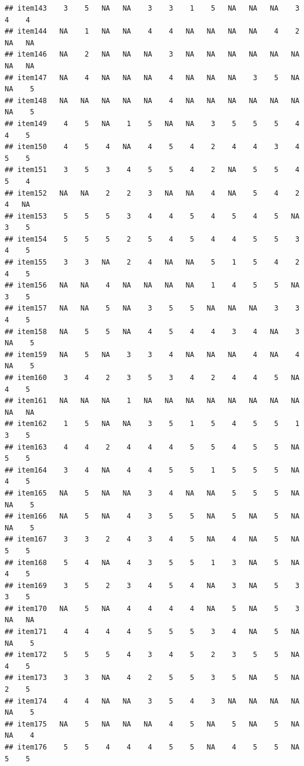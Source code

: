 \documentclass[
  man]{apa6}
\begin{document}
\begin{verbatim}
## item143    3    5   NA   NA    3    3    1    5   NA   NA   NA    3    4    4
## item144   NA    1   NA   NA    4    4   NA   NA   NA   NA    4    2   NA   NA
## item146   NA    2   NA   NA   NA    3   NA   NA   NA   NA   NA   NA   NA   NA
## item147   NA    4   NA   NA   NA    4   NA   NA   NA    3    5   NA   NA    5
## item148   NA   NA   NA   NA   NA    4   NA   NA   NA   NA   NA   NA   NA    5
## item149    4    5   NA    1    5   NA   NA    3    5    5    5    4    4    5
## item150    4    5    4   NA    4    5    4    2    4    4    3    4    5    5
## item151    3    5    3    4    5    5    4    2   NA    5    5    4    5    4
## item152   NA   NA    2    2    3   NA   NA    4   NA    5    4    2    4   NA
## item153    5    5    5    3    4    4    5    4    5    4    5   NA    3    5
## item154    5    5    5    2    5    4    5    4    4    5    5    3    4    5
## item155    3    3   NA    2    4   NA   NA    5    1    5    4    2    4    5
## item156   NA   NA    4   NA   NA   NA   NA    1    4    5    5   NA    3    5
## item157   NA   NA    5   NA    3    5    5   NA   NA   NA    3    3    4    5
## item158   NA    5    5   NA    4    5    4    4    3    4   NA    3   NA    5
## item159   NA    5   NA    3    3    4   NA   NA   NA    4   NA    4   NA    5
## item160    3    4    2    3    5    3    4    2    4    4    5   NA    4    5
## item161   NA   NA   NA    1   NA   NA   NA   NA   NA   NA   NA   NA   NA   NA
## item162    1    5   NA   NA    3    5    1    5    4    5    5    1    3    5
## item163    4    4    2    4    4    4    5    5    4    5    5   NA    5    5
## item164    3    4   NA    4    4    5    5    1    5    5    5   NA    4    5
## item165   NA    5   NA   NA    3    4   NA   NA    5    5    5   NA   NA    5
## item166   NA    5   NA    4    3    5    5   NA    5   NA    5   NA   NA    5
## item167    3    3    2    4    3    4    5   NA    4   NA    5   NA    5    5
## item168    5    4   NA    4    3    5    5    1    3   NA    5   NA    4    5
## item169    3    5    2    3    4    5    4   NA    3   NA    5    3    3    5
## item170   NA    5   NA    4    4    4    4   NA    5   NA    5    3   NA   NA
## item171    4    4    4    4    5    5    5    3    4   NA    5   NA   NA    5
## item172    5    5    5    4    3    4    5    2    3    5    5   NA    4    5
## item173    3    3   NA    4    2    5    5    3    5   NA    5   NA    2    5
## item174    4    4   NA   NA    3    5    4    3   NA   NA   NA   NA   NA    5
## item175   NA    5   NA   NA   NA    4    5   NA    5   NA    5   NA   NA    4
## item176    5    5    4    4    4    5    5   NA    4    5    5   NA    5    5

\end{verbatim}
\end{document}
